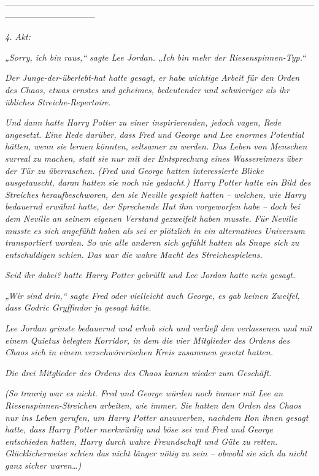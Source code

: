 {--------------------------------------------------------------------------------------------------------------------------------------------

\hfill\break \emph{4. Akt:}

\emph{„Sorry, ich bin raus,“ sagte Lee Jordan. „Ich bin mehr der Riesenspinnen-Typ.“}

\emph{Der Junge-der-überlebt-hat hatte gesagt, er habe} \emph{\emph{wichtige}} \emph{Arbeit für den} \emph{Orden des Chaos, etwas ernstes und geheimes, bedeutender und schwieriger als ihr übliches Streiche-Repertoire.}

\emph{Und dann hatte Harry Potter zu einer inspirierenden, jedoch vagen, Rede angesetzt. Eine Rede darüber, dass Fred und George und Lee enormes Potential hätten, wenn sie lernen könnten,} \emph{\emph{seltsamer}} \emph{zu werden. Das Leben von Menschen} \emph{\emph{surreal}} \emph{zu machen, statt sie nur mit der Entsprechung} \emph{eines} \emph{Wassereimers} \emph{über} \emph{der} \emph{Tür zu überraschen. (Fred und George hatten interessierte Blicke ausgetauscht, daran hatten sie noch nie gedacht.) Harry Potter hatte ein Bild des} \emph{Streiches} \emph{heraufbeschworen, den sie Neville gespielt hatten --} \emph{welchen, wie Harry bedauernd erwähnt hatte, der Sprechende Hut ihm vorgeworfen habe -- doch bei dem Neville} \emph{\emph{an seinem eigenen Verstand gezweifelt}} \emph{haben musste. Für Neville musste es sich angefühlt haben als sei er plötzlich in ein alternatives Universum transportiert worden. So wie alle anderen sich gefühlt hatten als Snape sich zu entschuldigen schien. Das war die} \emph{\emph{wahre Macht des Streichespielens.}}

\emph{\emph{Seid ihr dabei?}} \emph{hatte Harry Potter gebrüllt und Lee Jordan hatte nein gesagt.}

\emph{„Wir sind} \emph{\emph{drin,}“ sagte Fred oder vielleicht auch George, es gab keinen Zweifel, dass Godric Gryffindor ja gesagt hätte.}

\emph{Lee Jordan grinste bedauernd und erhob sich und verließ den verlassenen und mit einem Quietus belegten Korridor, in dem die vier Mitglieder des Ordens des Chaos sich in einem verschwörerischen Kreis zusammen gesetzt hatten.}

\emph{Die drei Mitglieder des Ordens des Chaos kamen wieder zum Geschäft.}

\emph{(\emph{So}} \emph{traurig war es nicht. Fred und George würden noch immer mit Lee an Riesenspinnen-Streichen arbeiten, wie immer. Sie hatten den Orden des Chaos nur ins Leben gerufen, um Harry Potter anzuwerben, nachdem Ron ihnen gesagt hatte, dass Harry Potter merkwürdig und böse sei und Fred und George entschieden hatten, Harry durch wahre Freundschaft und Güte zu retten. Glücklicherweise schien das nicht länger nötig zu sein -- obwohl sie sich da nicht} \emph{\emph{ganz}} \emph{sicher waren…)}

}
